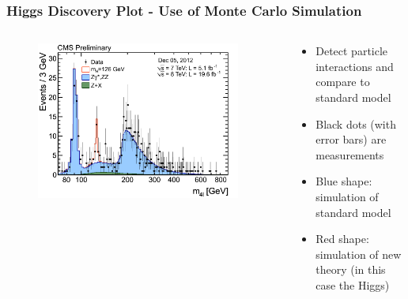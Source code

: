 \begin{frame}
\frametitle{Higgs Discovery Plot - Use of Monte Carlo Simulation}

\begin{columns}[T] %

\begin{column}{.60\textwidth}
\begin{figure}[htbp]
\begin{center}
\includegraphics[width=0.95\textwidth]{images/higgs-discovery-plot.png}
\end{center}
\end{figure}
\end{column}%

\begin{column}{.40\textwidth}
\begin{itemize}
\item Detect particle interactions and compare to standard model
\item Black dots (with error bars) are measurements
\item Blue shape: simulation of standard model
\item Red shape: simulation of new theory (in this case the Higgs)
\end{itemize}
\end{column}%

\end{columns}


\end{frame}


